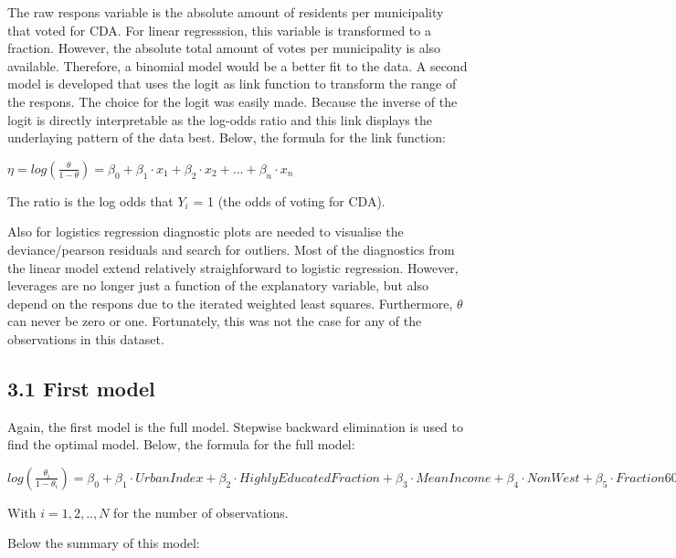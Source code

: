 \documentclass[11pt,]{article}
\begin{document}
The raw respons variable is the absolute amount of residents per
municipality that voted for CDA. For linear regresssion, this variable
is transformed to a fraction. However, the absolute total amount of
votes per municipality is also available. Therefore, a binomial model
would be a better fit to the data. A second model is developed that uses
the logit as link function to transform the range of the respons. The
choice for the logit was easily made. Because the inverse of the logit
is directly interpretable as the log-odds ratio and this link displays
the underlaying pattern of the data best. Below, the formula for the
link function:

\(\eta = log(\frac{\theta}{1 - \theta}) = \beta_0 + \beta_1 \cdot x_1 + \beta_2 \cdot x_2 + ... + \beta_n \cdot x_n\)

The ratio is the log odds that \(Y_i\) = 1 (the odds of voting for CDA).

Also for logistics regression diagnostic plots are needed to visualise
the deviance/pearson residuals and search for outliers. Most of the
diagnostics from the linear model extend relatively straighforward to
logistic regression. However, leverages are no longer just a function of
the explanatory variable, but also depend on the respons due to the
iterated weighted least squares. Furthermore, \(\theta\) can never be
zero or one. Fortunately, this was not the case for any of the
observations in this dataset.

\subsection{3.1 First model}\label{first-model-1}

Again, the first model is the full model. Stepwise backward elimination
is used to find the optimal model. Below, the formula for the full
model:

\(log(\frac{\theta_i}{1 - \theta_i}) = \beta_0 + \beta_1 \cdot UrbanIndex + \beta_2 \cdot HighlyEducatedFraction + \beta_3 \cdot MeanIncome + \beta_4 \cdot NonWest + \beta_5 \cdot Fraction60Plus + \epsilon_i\)

With \(i = 1, 2,.., N\) for the number of observations.

Below the summary of this model:
\end{document}
